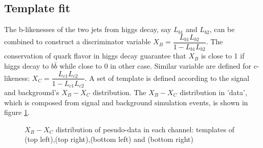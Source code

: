 \subsection{Template fit}\label{subsec:templatefit}
 The b-likenesses of the two jets from higgs decay, say $L_{b1}$ and $L_{b2}$, can be combined to construct a discriminator variable $X_B = \dfrac{L_{b1}L_{b2}}{1-L_{b1}L_{b2}}$.  The conservation of quark flavor in higgs decay guarantee that $X_B$ is close to 1 if higgs decay to $b\bar{b}$ while close to 0 in other case. 
 Similar variable are defined for c-likeness: $X_C = \dfrac{L_{c1}L_{c2}}{1-L_{c1}L_{c2}}$. A set of template is defined according to the signal and background's $X_B-X_C$ distribution.  The $X_B-X_C$ distribution in 'data', which is composed from signal and background simulation events, is shown in figure \ref{fig:data_template}.
 \begin{figure}[!htpb]
 \label{fig:data_template}
 \centering
 \caption{$X_B-X_C$ distribution of pesudo-data in each channel: templates of \eeh(top left),\mmh(top right),\nnh(bottom left) and \qqh(bottom right)}
 \end{figure}

